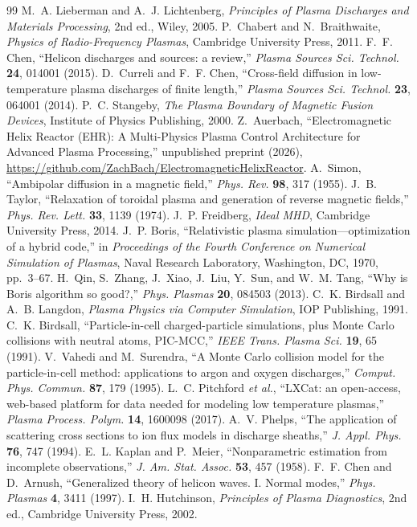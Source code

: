 \documentclass[11pt]{article}
\begin{document}
\begin{thebibliography}{99}
 M.~A. Lieberman and A.~J. Lichtenberg, \textit{Principles of Plasma Discharges and Materials Processing}, 2nd ed., Wiley, 2005.
 P.~Chabert and N.~Braithwaite, \textit{Physics of Radio-Frequency Plasmas}, Cambridge University Press, 2011.
 F.~F. Chen, ``Helicon discharges and sources: a review,'' \textit{Plasma Sources Sci. Technol.} \textbf{24}, 014001 (2015).
 D.~Curreli and F.~F. Chen, ``Cross-field diffusion in low-temperature plasma discharges of finite length,'' \textit{Plasma Sources Sci. Technol.} \textbf{23}, 064001 (2014).
 P.~C. Stangeby, \textit{The Plasma Boundary of Magnetic Fusion Devices}, Institute of Physics Publishing, 2000.
 Z.~Auerbach, ``Electromagnetic Helix Reactor (EHR): A Multi-Physics Plasma Control Architecture for Advanced Plasma Processing,'' unpublished preprint (2026), \url{https://github.com/ZachBach/ElectromagneticHelixReactor}.
 A.~Simon, ``Ambipolar diffusion in a magnetic field,'' \textit{Phys. Rev.} \textbf{98}, 317 (1955).
 J.~B. Taylor, ``Relaxation of toroidal plasma and generation of reverse magnetic fields,'' \textit{Phys. Rev. Lett.} \textbf{33}, 1139 (1974).
 J.~P. Freidberg, \textit{Ideal MHD}, Cambridge University Press, 2014.
 J.~P. Boris, ``Relativistic plasma simulation---optimization of a hybrid code,'' in \textit{Proceedings of the Fourth Conference on Numerical Simulation of Plasmas}, Naval Research Laboratory, Washington, DC, 1970, pp.~3--67.
 H.~Qin, S.~Zhang, J.~Xiao, J.~Liu, Y.~Sun, and W.~M. Tang, ``Why is Boris algorithm so good?,'' \textit{Phys. Plasmas} \textbf{20}, 084503 (2013).
 C.~K. Birdsall and A.~B. Langdon, \textit{Plasma Physics via Computer Simulation}, IOP Publishing, 1991.
 C.~K. Birdsall, ``Particle-in-cell charged-particle simulations, plus Monte Carlo collisions with neutral atoms, PIC-MCC,'' \textit{IEEE Trans. Plasma Sci.} \textbf{19}, 65 (1991).
 V.~Vahedi and M.~Surendra, ``A Monte Carlo collision model for the particle-in-cell method: applications to argon and oxygen discharges,'' \textit{Comput. Phys. Commun.} \textbf{87}, 179 (1995).
 L.~C. Pitchford \textit{et al.}, ``LXCat: an open-access, web-based platform for data needed for modeling low temperature plasmas,'' \textit{Plasma Process. Polym.} \textbf{14}, 1600098 (2017).
 A.~V. Phelps, ``The application of scattering cross sections to ion flux models in discharge sheaths,'' \textit{J. Appl. Phys.} \textbf{76}, 747 (1994).
 E.~L. Kaplan and P.~Meier, ``Nonparametric estimation from incomplete observations,'' \textit{J. Am. Stat. Assoc.} \textbf{53}, 457 (1958).
 F.~F. Chen and D.~Arnush, ``Generalized theory of helicon waves. I. Normal modes,'' \textit{Phys. Plasmas} \textbf{4}, 3411 (1997).
 I.~H. Hutchinson, \textit{Principles of Plasma Diagnostics}, 2nd ed., Cambridge University Press, 2002.
\end{thebibliography}
\end{document}
